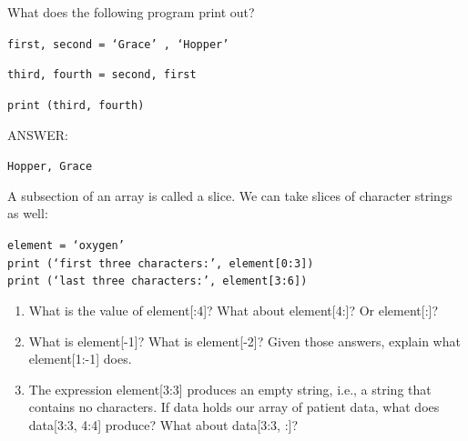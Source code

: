 \documentclass{beamer}
\begin{document}

\begin{frame}{ }
What does the following program print out?
\vspace{0.5cm}

\begin{beamerboxesrounded}[upper=uppercolgreen,lower=lowercolgreen,shadow=false]{}

\texttt{first, second = `Grace' , `Hopper'}

\texttt{third, fourth = second, first}

\texttt{print (third, fourth)}

\end{beamerboxesrounded}

\alert{ANSWER:}

\texttt{Hopper, Grace}
\end{frame}



\begin{frame}{ }
A subsection of an array is called a slice. We can take slices of character strings as well:

\begin{beamerboxesrounded}[upper=uppercolgreen,lower=lowercolgreen,shadow=false]{}

\texttt{element = `oxygen'\\
print (`first three characters:', element[0:3])\\
print (`last three characters:', element[3:6])\\}
\end{beamerboxesrounded}

\begin{enumerate}
\item{What is the value of element[:4]? What about element[4:]? Or element[:]?}
\item{What is element[-1]? What is element[-2]? Given those answers, explain what element[1:-1] does.}
 \item{The expression element[3:3] produces an empty string, i.e., a string that contains no characters. If data holds our array of patient data, what does data[3:3, 4:4] produce? What about data[3:3, :]?}
\end{enumerate}

\end{frame}
\end{document}
